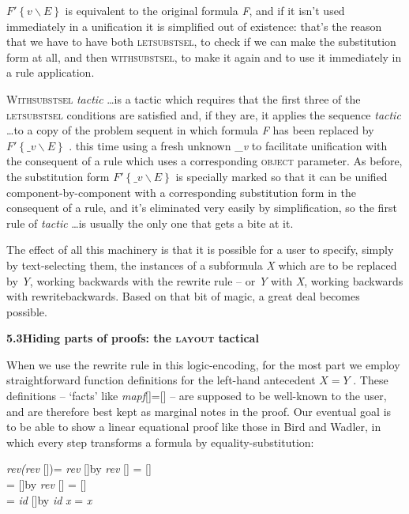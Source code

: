 \documentclass[11pt]{book}
\newcommand{\tab}{\hspace{5mm}}
\begin{document}
$F' \left\{ v\backslash E\right\} $ is equivalent to the original formula \textit{F}, and if it isn't used immediately in a unification it is simplified out of existence: that's the reason that we have to have both \textsc{letsubstsel}, to check if we can make the substitution form at all, and then \textsc{withsubstsel,} to make it again and to use it immediately in a rule application.


\textsc{Withsubstsel} \textit{tactic} \dots is a tactic which requires that the first three of the \textsc{letsubstsel} conditions are satisfied and, if they are, it applies the sequence \textit{tactic} \dots to a copy of the problem sequent in which formula \textit{F} has been replaced by $F' \left\{ \_{}v\backslash E\right\} $ . this time using a fresh unknown \_\textit{v} to facilitate unification with the consequent of a rule which uses a corresponding \textsc{object} parameter. As before, the substitution form $F' \left\{ \_{}v\backslash E\right\} $ is specially marked so that it can be unified component-by-component with a corresponding substitution form in the consequent of a rule, and it's eliminated very easily by simplification, so the first rule of \textit{tactic} \dots  is usually the only one that gets a bite at it.


The effect of all this machinery is that it is possible for a user to specify, simply by text-selecting them, the instances of a subformula \textit{X} which are to be replaced by \textit{Y}, working backwards with the rewrite rule -- or \textit{Y} with \textit{X}, working backwards with rewritebackwards. Based on that bit of magic, a great deal becomes possible.


\textbf{{\large 5.3\tab Hiding parts of proofs: the \textsc{layout} tactical}}


When we use the rewrite rule in this logic-encoding, for the most part we employ straightforward function definitions for the left-hand antecedent $X=Y$ . These definitions -- `facts' like \textit{map{\nobreakspace}f{\nobreakspace}}[]{\nobreakspace}={\nobreakspace}[] -- are supposed to be well-known to the user, and are therefore best kept as marginal notes in the proof. Our eventual goal is to be able to show a linear equational proof like those in Bird and Wadler, in which every step transforms a formula by equality-substitution:

\textit{rev(rev} [])\tab = \textit{rev} []\tab by \textit{rev} [] = []\\
= []\tab by \textit{rev} [] = []\\
= \textit{id} []\tab by \textit{id} \textit{x} = \textit{x}
\end{document}
